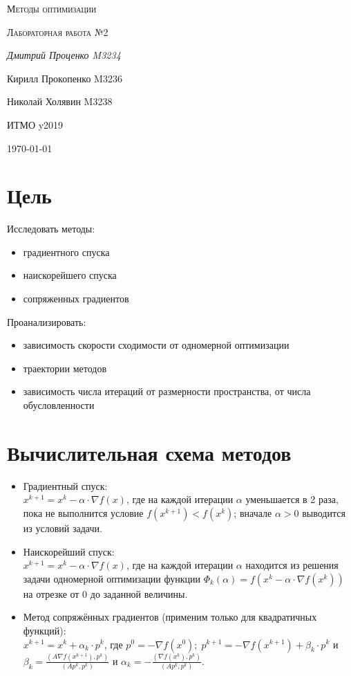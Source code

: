 \documentclass[russian, english]{article}
\begin{document}
\begin{titlepage}
\centering
	{\scshape\LARGE Методы оптимизации \par}
	\vspace{1cm}
	{\scshape\Large Лабораторная работа №2\par}
	\vspace{2cm}
	{\Large\itshape Дмитрий Проценко M3234 \par
	Кирилл Прокопенко M3236 \par
	Николай Холявин M3238 \par}
	\vfill
	ИТМО y2019
	\vfill
	{\large \today\par}
\end{titlepage}

\tableofcontents
\newpage

\section{Цель}
Исследовать методы:
\begin{itemize}
	\item градиентного спуска
	\item наискорейшего спуска
	\item сопряженных градиентов
\end{itemize}
Проанализировать:
\begin{itemize}
	\item зависимость скорости сходимости от одномерной оптимизации
	\item траектории методов
	\item зависимость числа итераций от размерности пространства, от числа обусловленности
\end{itemize}

\section{Вычислительная схема методов}
\begin{itemize}
\item Градиентный спуск:\\
$x^{k+1}=x^k-\alpha\cdot\nabla f(x)$, где на каждой итерации $\alpha$ уменьшается в 2 раза, пока не выполнится условие $f(x^{k+1}) < f(x^k)$; вначале $\alpha > 0$ выводится из условий задачи.
\item Наискорейший спуск:\\
$x^{k+1}=x^k-\alpha\cdot\nabla f(x)$, где на каждой итерации $\alpha$ находится из решения задачи одномерной оптимизации функции $\Phi_k(\alpha) = f(x^k - \alpha\cdot\nabla f(x^k))$ на отрезке от 0 до заданной величины.
\item Метод сопряжённых градиентов (применим только для квадратичных функций):\\
$x^{k+1}=x^k+\alpha_k\cdot p^k$, где $p^0 = -\nabla f(x^0); \; p^{k+1}=-\nabla f(x^{k+1})+\beta_k\cdot p^k$ и $\beta_k = \frac{\left(A \nabla f(x^{k+1}), p^k\right)}{\left(Ap^k, p^k\right)}$ и $\alpha_k=-\frac{\left(\nabla f(x^k), p^k\right)}{\left(Ap^k, p^k\right)}.$
\end{itemize}
\end{document}
